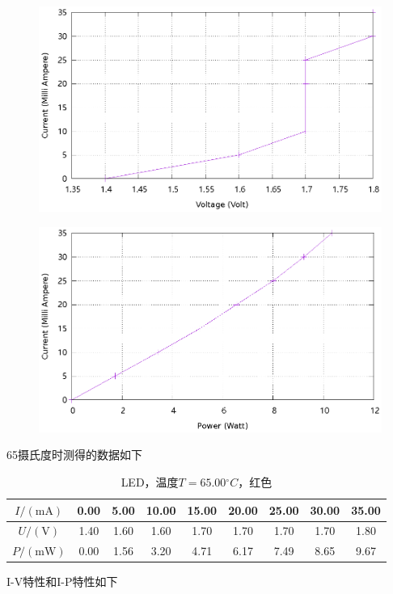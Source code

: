 \documentclass{ctexart}
\newcommand{\si}[1]{\mathrm{#1}}
\begin{document}
\begin{figure}[H]
  \centering
  \includegraphics[width=0.8\linewidth]{optics-figures/led-vc-7.gnuplot}
\end{figure}

\begin{figure}[H]
  \centering
  \includegraphics[width=0.8\linewidth]{optics-figures/led-pc-7.gnuplot}
\end{figure}

\newpage
65摄氏度时测得的数据如下

\begin{table}[H]
  \centering
  \begin{tabular}{|c|c|c|c|c|c|c|c|c|}
    \hline
    $I/(\si{mA})$   & 0.00 & 5.00 & 10.00 & 15.00 & 20.00 & 25.00 & 30.00 & 35.00 \\\hline
    $U / (\si{V})$  & 1.40 & 1.60 & 1.60 & 1.70 & 1.70 & 1.70 & 1.70 & 1.80 \\\hline
    $P / (\si{mW})$ & 0.00 & 1.56 & 3.20 & 4.71 & 6.17 & 7.49 & 8.65 & 9.67 \\\hline
  \end{tabular}
  \caption{LED，温度$T=65.00{}^{\circ}C$，红色}
\end{table}

I-V特性和I-P特性如下
\end{document}
